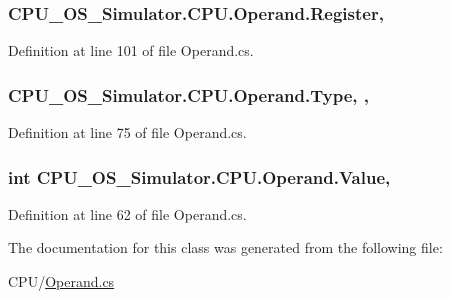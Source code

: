 \subsubsection[{Register}]{ C\+P\+U\+\_\+\+O\+S\+\_\+\+Simulator.\+C\+P\+U.\+Operand.\+Register\hspace{0.3cm}{\ttfamily [get]}, {\ttfamily [set]}}\label{class_c_p_u___o_s___simulator_1_1_c_p_u_1_1_operand_a8f08360f0e27922fc0377f5d58a9e67f}


Definition at line 101 of file Operand.\+cs.

\hypertarget{class_c_p_u___o_s___simulator_1_1_c_p_u_1_1_operand_a0b0deae57b760df3a083dc54535b0891}{}
\subsubsection[{Type}]{ C\+P\+U\+\_\+\+O\+S\+\_\+\+Simulator.\+C\+P\+U.\+Operand.\+Type\hspace{0.3cm}{\ttfamily [get]}, {\ttfamily [set]}, {\ttfamily [package]}}\label{class_c_p_u___o_s___simulator_1_1_c_p_u_1_1_operand_a0b0deae57b760df3a083dc54535b0891}


Definition at line 75 of file Operand.\+cs.

\hypertarget{class_c_p_u___o_s___simulator_1_1_c_p_u_1_1_operand_ab109292eba2094db4d7f21cbdbd5bc9e}{}
\subsubsection[{Value}]{\setlength{\rightskip}{0pt plus 5cm}int C\+P\+U\+\_\+\+O\+S\+\_\+\+Simulator.\+C\+P\+U.\+Operand.\+Value\hspace{0.3cm}{\ttfamily [get]}, {\ttfamily [set]}}\label{class_c_p_u___o_s___simulator_1_1_c_p_u_1_1_operand_ab109292eba2094db4d7f21cbdbd5bc9e}


Definition at line 62 of file Operand.\+cs.



The documentation for this class was generated from the following file\+:\begin{DoxyCompactItemize}
\item 
C\+P\+U/\hyperlink{_operand_8cs}{Operand.\+cs}\end{DoxyCompactItemize}
